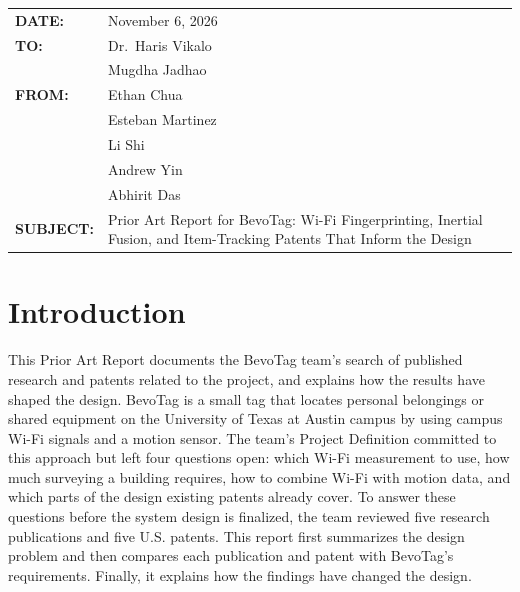 \documentclass[12pt,letterpaper]{article}
\begin{document}
\thispagestyle{empty}

\begingroup
{}
\newcommand{\fieldgap}{\\[6.2pt]}
\noindent\begin{tabular}{@{}p{1.1in}@{}p{\dimexpr\linewidth-1.1in\relax}@{}}
\textbf{DATE:} & November 6, 2026 \fieldgap
\textbf{TO:} & Dr.\ Haris Vikalo \\ & Mugdha Jadhao \fieldgap
\textbf{FROM:} & Ethan Chua \\ & Esteban Martinez \\ & Li Shi \\ & Andrew Yin \\ & Abhirit Das \fieldgap
\textbf{SUBJECT:} & Prior Art Report for BevoTag: Wi-Fi Fingerprinting, Inertial Fusion, and
Item-Tracking Patents That Inform the Design \\
\end{tabular}
\endgroup

\section{Introduction}
This Prior Art Report documents the BevoTag team's search of published research and patents related
to the project, and explains how the results have shaped the design.
BevoTag is a small tag that locates personal belongings or shared equipment on the University
of Texas at Austin campus by using campus Wi-Fi signals and a motion sensor. The team's Project Definition
committed to this approach but left four questions open: which Wi-Fi measurement to use, how much
surveying a building requires, how to combine Wi-Fi with motion data, and which parts of the design
existing patents already cover. To answer these questions before the system design is finalized,
the team reviewed five research publications and five U.S. patents. This report first summarizes
the design problem and then compares each publication and patent with BevoTag's requirements.
Finally, it explains how the findings have changed the design.

\end{document}
